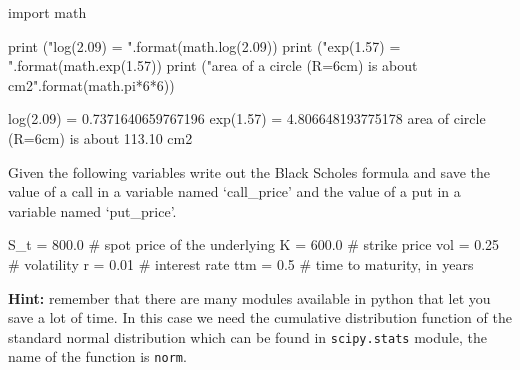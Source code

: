 \cprotEnv \begin{solution}
\begin{ipython}
import math

print ("log(2.09) = {}".format(math.log(2.09))
print ("exp(1.57) = {}".format(math.exp(1.57))
print ("area of a circle (R=6cm) is about {} cm2".format(math.pi*6*6))

log(2.09) = 0.7371640659767196
exp(1.57) = 4.806648193775178
area of circle (R=6cm) is about 113.10 cm2
\end{ipython}
\end{solution}

\cprotEnv \begin{question}
Given the following variables write out the Black Scholes formula and save the value of a call in a variable named `call\_price' and the value of a put in a variable named `put\_price'.

\begin{ipython}
S_t = 800.0 # spot price of the underlying
K = 600.0 # strike price
vol = 0.25 # volatility
r = 0.01 # interest rate
ttm = 0.5 # time to maturity, in years
\end{ipython}
\textbf{Hint:} remember that there are many modules available in python that let you save a lot of time. In this case we need the cumulative distribution function of the standard normal distribution which can be found in \texttt{scipy.stats} module, the name of the function is \texttt{norm}.
\end{question}

